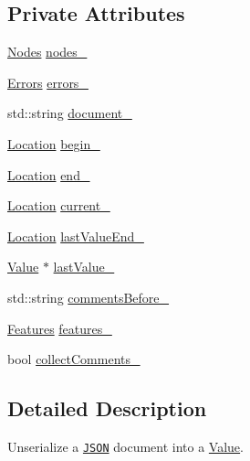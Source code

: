 \subsection*{Private Attributes}
\begin{DoxyCompactItemize}
\item 
\hyperlink{classJson_1_1Reader_ad98d0ea4f3576ea83947c1b2b7b2f261}{Nodes} \hyperlink{classJson_1_1Reader_ada3d2c47699dad662e6d156c8c78a6ac}{nodes\-\_\-}
\item 
\hyperlink{classJson_1_1Reader_aae51e8f5bab3f067261c842a3ef858e5}{Errors} \hyperlink{classJson_1_1Reader_a1bbce45dc4df753bed60c129f4b5147c}{errors\-\_\-}
\item 
std\-::string \hyperlink{classJson_1_1Reader_afde4a4311ae30597da5b6060a8d60542}{document\-\_\-}
\item 
\hyperlink{classJson_1_1Reader_a46795b5b272bf79a7730e406cb96375a}{Location} \hyperlink{classJson_1_1Reader_a327166839022ea91f0a8290960a8af76}{begin\-\_\-}
\item 
\hyperlink{classJson_1_1Reader_a46795b5b272bf79a7730e406cb96375a}{Location} \hyperlink{classJson_1_1Reader_a714793579cbf4ee7c5a7223d2c8d77c1}{end\-\_\-}
\item 
\hyperlink{classJson_1_1Reader_a46795b5b272bf79a7730e406cb96375a}{Location} \hyperlink{classJson_1_1Reader_a2f2feb5201a26da7aa133d2f7434479b}{current\-\_\-}
\item 
\hyperlink{classJson_1_1Reader_a46795b5b272bf79a7730e406cb96375a}{Location} \hyperlink{classJson_1_1Reader_a497a114f7b760f1b794b8fff9876615a}{last\-Value\-End\-\_\-}
\item 
\hyperlink{classJson_1_1Value}{Value} $\ast$ \hyperlink{classJson_1_1Reader_a320c91fa65cd76138ba445af6cbb6d29}{last\-Value\-\_\-}
\item 
std\-::string \hyperlink{classJson_1_1Reader_a240d10ca88620e06a5bd25cc633e9a8a}{comments\-Before\-\_\-}
\item 
\hyperlink{classJson_1_1Features}{Features} \hyperlink{classJson_1_1Reader_aa9984ff8f519b5541346157b7aebf97b}{features\-\_\-}
\item 
bool \hyperlink{classJson_1_1Reader_a8e9ce743f6004f0596692f0a9ee4626c}{collect\-Comments\-\_\-}
\end{DoxyCompactItemize}


\subsection{Detailed Description}
Unserialize a \href{http://www.json.org}{\tt J\-S\-O\-N} document into a \hyperlink{classJson_1_1Value}{Value}. 



